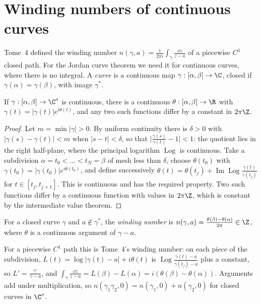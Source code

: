 \section{Winding numbers of continuous curves}

Tome~4 defined the winding number $n(\gamma,a)=\frac1{2\pi i}\int_\gamma\frac{\dd z}{z-a}$ of a piecewise $C^1$ closed path. For the Jordan curve theorem we need it for
continuous curves, where there is no integral. A \emph{curve} is a continuous map $\gamma:[\alpha,\beta]\to\C$, closed if $\gamma(\alpha)=\gamma(\beta)$, with image $\gamma^*$.

\begin{lemma}\label{lem:lift}
If $\gamma:[\alpha,\beta]\to\C^*$ is continuous, there is a continuous $\theta:[\alpha,\beta]\to\R$ with $\gamma(t)=|\gamma(t)|e^{i\theta(t)}$, and any two such functions differ by
a constant in $2\pi\Z$.
\end{lemma}
\begin{proof}
Let $m=\min|\gamma|>0$. By uniform continuity there is $\delta>0$ with $|\gamma(s)-\gamma(t)|<m$ when $|s-t|<\delta$, so that $\bigl|\frac{\gamma(s)}{\gamma(t)}-1\bigr|<1$: the quotient lies
in the right half-plane, where the principal logarithm $\operatorname{Log}$ is continuous. Take a subdivision $\alpha=t_0<\dots<t_N=\beta$ of mesh less than $\delta$, choose $\theta(t_0)$ with
$\gamma(t_0)=|\gamma(t_0)|e^{i\theta(t_0)}$, and define successively $\theta(t)=\theta(t_j)+\operatorname{Im}\operatorname{Log}\frac{\gamma(t)}{\gamma(t_j)}$ for $t\in[t_j,t_{j+1}]$. This is continuous and has the required
property. Two such functions differ by a continuous function with values in $2\pi\Z$, which is constant by the intermediate value theorem.
\end{proof}

\begin{definition}
For a closed curve $\gamma$ and $a\notin\gamma^*$, the \emph{winding number} is $n(\gamma,a)=\frac{\theta(\beta)-\theta(\alpha)}{2\pi}\in\Z$, where $\theta$ is a continuous argument of $\gamma-a$.
\end{definition}

For a piecewise $C^1$ path this is Tome~4's winding number: on each piece of the subdivision, $L(t)=\log|\gamma(t)-a|+i\theta(t)$ is
$\operatorname{Log}\frac{\gamma(t)-a}{\gamma(t_j)-a}$ plus a constant, so $L'=\frac{\gamma'}{\gamma-a}$, and $\int_\gamma\frac{\dd z}{z-a}=L(\beta)-L(\alpha)=i(\theta(\beta)-\theta(\alpha))$. Arguments add under
multiplication, so $n(\gamma_1\gamma_2,0)=n(\gamma_1,0)+n(\gamma_2,0)$ for closed curves in $\C^*$.

